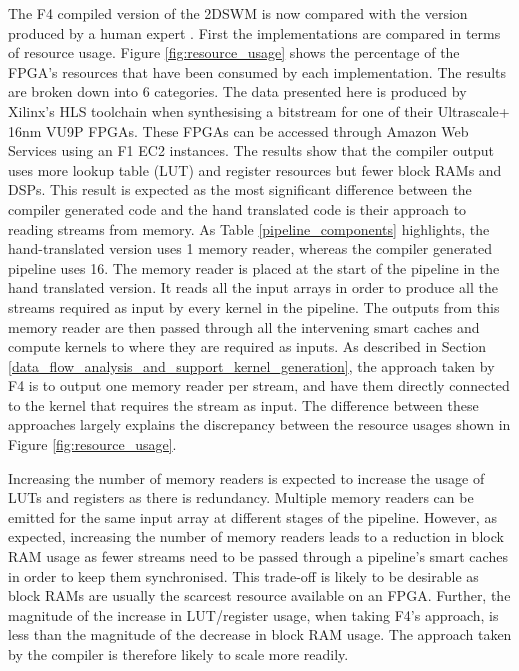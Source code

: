 \documentclass{mpaper}
\begin{document}
The F4 compiled version of the 2DSWM is now compared with the version produced by a human expert \cite{VanderbauwhedeNabi2018}. 
First the implementations are compared in terms of resource usage.
Figure \ref{fig:resource_usage} shows the percentage of the FPGA's resources that have been consumed by each implementation.
The results are broken down into 6 categories. 
The data presented here is produced by Xilinx's HLS toolchain when synthesising a bitstream for one of their Ultrascale+ 16nm VU9P FPGAs.
These FPGAs can be accessed through Amazon Web Services using an F1 EC2 instances.
The results show that the compiler output uses more lookup table (LUT) and register resources but fewer block RAMs and DSPs.
This result is expected as the most significant difference between the compiler generated code and the hand translated code is their approach to reading streams from memory.
As Table \ref{pipeline_components} highlights, the hand-translated version uses 1 memory reader, whereas the compiler generated pipeline uses 16.
The memory reader is placed at the start of the pipeline in the hand translated version.
It reads all the input arrays in order to produce all the streams required as input by every kernel in the pipeline. 
The outputs from this memory reader are then passed through all the intervening smart caches and compute kernels to where they are required as inputs. 
As described in Section \ref{data_flow_analysis_and_support_kernel_generation}, the approach taken by F4 is to output one memory reader per stream, and have them directly connected to the kernel that requires the stream as input.
The difference between these approaches largely explains the discrepancy between the resource usages shown in Figure \ref{fig:resource_usage}.

Increasing the number of memory readers is expected to increase the usage of LUTs and registers as there is redundancy.
Multiple memory readers can be emitted for the same input array at different stages of the pipeline.
However, as expected, increasing the number of memory readers leads to a reduction in block RAM usage as fewer streams need to be passed through a pipeline's smart caches in order to keep them synchronised.  
This trade-off is likely to be desirable as block RAMs are usually the scarcest resource available on an FPGA.
Further, the magnitude of the increase in LUT/register usage, when taking F4's approach, is less than the magnitude of the decrease in block RAM usage. 
The approach taken by the compiler is therefore likely to scale more readily.
\end{document}
